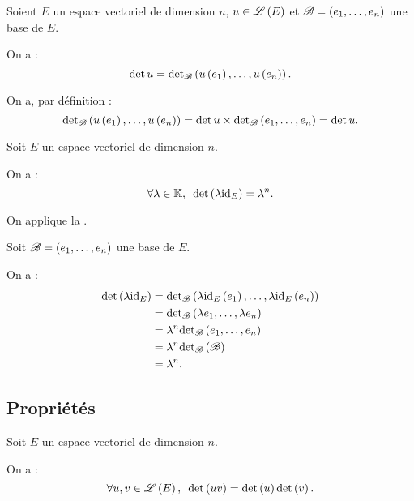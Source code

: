 \begin{rem}
Soient \(E\) un espace vectoriel de dimension \(n\), \(u\in\mathscr{L}\left(E\right)\) et \(\mathscr{B}=\left(e_1,\dots,e_n\right)\) une base de \(E\).

On a : \[\det u=\detb\paren{u\paren{e_1},\dots,u\paren{e_n}}.\]
\end{rem}

\begin{dem}
On a, par définition : \[\detb\paren{u\paren{e_1},\dots,u\paren{e_n}}=\det u\times\detb\paren{e_1,\dots,e_n}=\det u.\]
\end{dem}

\begin{ex}
Soit \(E\) un espace vectoriel de dimension \(n\).

On a : \[\quantifs{\forall\lambda\in\K}\det\paren{\lambda\id{E}}=\lambda^n.\]
\end{ex}

\begin{dem}
On applique la .

Soit \(\mathscr{B}=\left(e_1,\dots,e_n\right)\) une base de \(E\).

On a : \[\begin{aligned}
\det\paren{\lambda\id{E}}&=\detb\paren{\lambda\id{E}\paren{e_1},\dots,\lambda\id{E}\paren{e_n}} \\
&=\detb\paren{\lambda e_1,\dots,\lambda e_n} \\
&=\lambda^n\detb\paren{e_1,\dots,e_n} \\
&=\lambda^n\detb\paren{\fami{B}} \\
&=\lambda^n.
\end{aligned}\]
\end{dem}

\subsection{Propriétés}

\begin{prop}
Soit \(E\) un espace vectoriel de dimension \(n\).

On a : \[\quantifs{\forall u,v\in\Lendo{E}}\det\paren{uv}=\det\paren{u}\det\paren{v}.\]
\end{prop}

